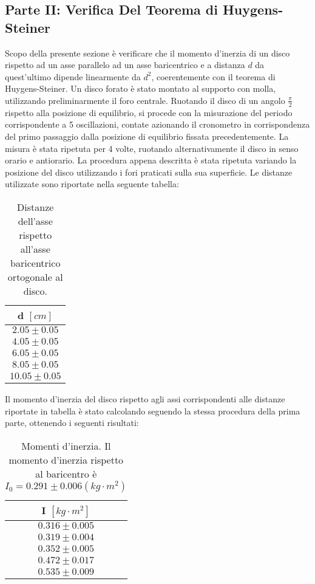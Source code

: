 \subsection{Parte II: Verifica Del Teorema di Huygens-Steiner}
Scopo della presente sezione è verificare che il momento d'inerzia di un disco rispetto ad un asse parallelo ad un asse baricentrico e a distanza $d$ da quest'ultimo dipende linearmente da $d^2$, coerentemente con il teorema di Huygens-Steiner. Un disco forato è stato montato al supporto con molla, utilizzando preliminarmente il foro centrale. Ruotando il disco di un angolo $\frac{\pi}{2}$ rispetto alla posizione di equilibrio, si procede con la misurazione del periodo corrispondente a 5 oscillazioni, contate azionando il cronometro in corrispondenza del primo passaggio dalla posizione di equilibrio fissata precedentemente. La misura è stata ripetuta per 4 volte, ruotando alternativamente il disco in senso orario e antiorario. La procedura appena descritta è stata ripetuta variando la posizione del disco utilizzando i fori praticati sulla sua superficie. Le distanze utilizzate sono riportate nella seguente tabella:

\begin{table}[H]
	\centering
	\begin{tabular}{|c|}
		\hline
		\textbf{d $[cm]$} \\
		\hline
		$2.05\pm 0.05$ \\
		$4.05\pm 0.05$ \\
		$6.05\pm 0.05$ \\
		$8.05\pm 0.05$ \\
            $10.05 \pm 0.05$ \\
		\hline
	\end{tabular}
	\caption{Distanze dell'asse rispetto all'asse baricentrico ortogonale al disco.}
	\label{tab:}
\end{table}

Il momento d'inerzia del disco rispetto agli assi corrispondenti alle distanze riportate in tabella è stato calcolando seguendo la stessa procedura della prima parte, ottenendo i seguenti risultati:

\begin{table}[H]
	\centering
	\begin{tabular}{|c|}
		\hline
		\textbf{I $[kg \cdot m^2]$} \\
		\hline
		$0.316\pm 0.005$ \\
		$0.319\pm 0.004$ \\
		$0.352\pm 0.005$ \\
		$0.472\pm 0.017$ \\
            $0.535 \pm 0.009$ \\
		\hline
	\end{tabular}
	\caption{Momenti d'inerzia. Il momento d'inerzia rispetto al baricentro è $I_0 = 0.291\pm 0.006 (kg \cdot m^2)$}
	\label{tab:}
\end{table}

